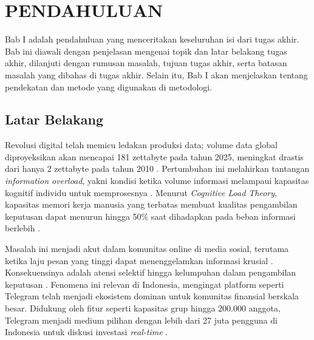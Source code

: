\chapter{PENDAHULUAN}
\label{chap:pendahuluan}

Bab I adalah pendahuluan yang menceritakan keseluruhan isi dari tugas akhir. Bab ini diawali dengan penjelasan mengenai topik dan latar belakang tugas akhir, dilanjuti dengan rumusan masalah, tujuan tugas akhir, serta batasan masalah yang dibahas di tugas akhir. Selain itu, Bab I akan menjelaskan tentang pendekatan dan metode yang digunakan di metodologi.

\section{Latar Belakang}
Revolusi digital telah memicu ledakan produksi data; volume data global diproyeksikan akan mencapai 181 zettabyte pada tahun 2025, meningkat drastis dari hanya 2 zettabyte pada tahun 2010 \autocite{idc2025}. Pertumbuhan ini melahirkan tantangan \textit{information overload}, yakni kondisi ketika volume informasi melampaui kapasitas kognitif individu untuk memprosesnya \autocite{eppler2004}. Menurut \textit{Cognitive Load Theory}, kapasitas memori kerja manusia yang terbatas membuat kualitas pengambilan keputusan dapat menurun hingga 50\% saat dihadapkan pada beban informasi berlebih \autocite{sweller1988,arnold2023}.

Masalah ini menjadi akut dalam komunitas online di media sosial, terutama ketika laju pesan yang tinggi dapat menenggelamkan informasi krusial \autocite{nematzadeh2019}. Konsekuensinya adalah atensi selektif hingga kelumpuhan dalam pengambilan keputusan \autocite{edmunds2000}. Fenomena ini relevan di Indonesia, mengingat platform seperti Telegram telah menjadi ekosistem dominan untuk komunitas finansial berskala besar. Didukung oleh fitur seperti kapasitas grup hingga 200.000 anggota, Telegram menjadi medium pilihan dengan lebih dari 27 juta pengguna di Indonesia untuk diskusi investasi \textit{real-time} \autocite{statista2024,perlo2025}.

